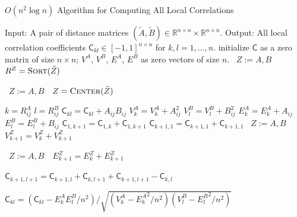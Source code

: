 \documentclass[11pt]{article}
\newcommand{\Real}{\mathbb{R}}
\newcommand{\G}{\mathsf{C}}
\newcommand{\Linefor}[2]{%
    \State \algorithmicfor\ {#1}\ \algorithmicdo\ {#2} \algorithmicend\ \algorithmicfor%
}
\begin{document}
\begin{algorithm}
\caption{$O(n^2 \log n)$ Algorithm for Computing All Local Correlations}
\label{alg2}
\begin{algorithmic}[1]
\Statex Input: A pair of distance matrices $(\tilde{A},\tilde{B}) \in \Real^{n \times n} \times \Real^{n \times n}$.
\Statex Output: All local correlation coefficients $\G_{kl} \in [-1,1]^{n \times n}$ for $k,l=1,\ldots,n$.
\State initialize $\G$ as a zero matrix of size $n \times n$; $V^{A}$, $V^{B}$, $E^{A}$, $E^{B}$ as zero vectors of size $n$.
\Linefor{$Z:=A,B$}{$R^{Z}=\textsc{Sort}(\tilde{Z})$} 
\Linefor{$Z:=A,B$}{$Z=\textsc{Center}(\tilde{Z})$} 
\State $k=R^{A}_{ij}$
\State $l=R^{B}_{ij}$
\State $\G_{kl}=\G_{kl}+A_{ij}B_{ij}$
\State $V^{A}_{k}=V^{A}_{k}+A_{ij}^2$
\State $V^{B}_{l}=V^{B}_{l}+B_{ij}^2$
\State $E^{A}_{k}=E^{A}_{k}+A_{ij}$ 
\State $E^{B}_{l}=E^{B}_{l}+B_{ij}$
\EndFor
\Statex {}
\State $\G_{1, k+1}=\G_{1, k}+\G_{1, k+1}$
\State $\G_{k+1,1}=\G_{k+1,1}+\G_{k+1,1}$
\Linefor{$Z:=A,B$}{$V^{Z}_{k+1}=V^{Z}_{k}+V^{Z}_{k+1}$} 
\Linefor{$Z:=A,B$}{$E^{Z}_{k+1}=E^{Z}_{k}+E^{Z}_{k+1}$} 
\EndFor

\State $\G_{k+1,l+1}=\G_{k+1,l}+\G_{k,l+1}+\G_{k+1,l+1}-\G_{k,l}$
\EndFor

 
\State $\G_{kl}=\left(\G_{kl}-E^{A}_{k}E^{B}_{l}/n^2\right)/\sqrt{\left(V^{A}_{k}-{E^{A}_{k}}^2/n^2\right) \left(V^{B}_{l}-{E^{B}_{l}}^2/n^2\right)}$
\EndFor
\EndFunction
\end{algorithmic}
\end{algorithm}
\end{document}
